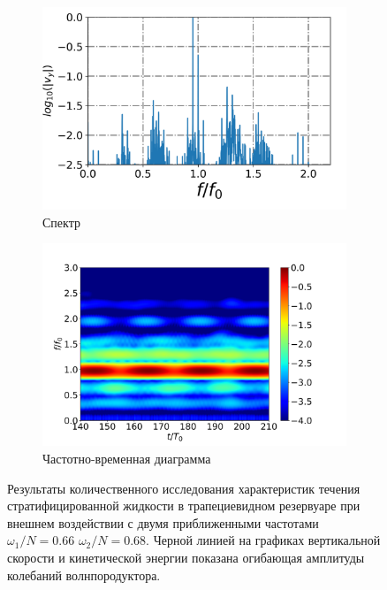 \begin{figure}
\begin{subfigure}[с]{0.45\textwidth}
    \includegraphics[width=1\textwidth]{pics/H40L60N1ap05dp20w1p63Deltawp05Biharm/spectrumX35p6Y11p2.png}
    \caption{Спектр}
  \end{subfigure}
  \begin{subfigure}[с]{0.45\textwidth}
    \includegraphics[width=1\textwidth]{pics/H40L60N1ap05dp20w1p63Deltawp05Biharm/TFspectrumX35p6Y11p2N200.png}
    \caption{Частотно-временная диаграмма}
    \label{}
  \end{subfigure}
  \caption{Результаты количественного исследования характеристик течения стратифицированной жидкости в трапециевидном резервуаре при внешнем воздействии с двумя приближенными частотами $\omega_1/N=0.66$ $\omega_2/N=0.68$. Черной линией  на графиках вертикальной скорости и кинетической энергии показана огибающая амплитуды колебаний волнпородуктора.}

  \label{fig:biharmVyap005-1}
\end{figure}


